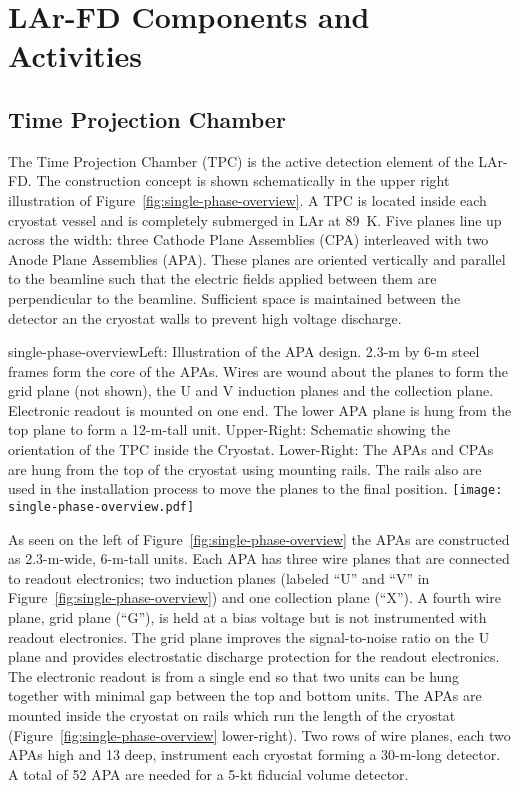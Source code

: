 \section{LAr-FD Components and Activities}
\label{sec:larfd-components}

\subsection{Time Projection Chamber}

The Time Projection Chamber (TPC) is the active detection element of the LAr-FD. The construction concept is  shown schematically in the upper right illustration of Figure~\ref{fig:single-phase-overview}.  A TPC is located inside each cryostat vessel and is completely submerged in LAr at 89~K. Five planes line up across the width: three Cathode Plane Assemblies (CPA)   interleaved with two Anode Plane Assemblies (APA). These planes are oriented vertically and  parallel to the beamline such that the electric fields applied between them are perpendicular to the beamline. Sufficient space is maintained between the detector an the cryostat walls to prevent high voltage discharge. 


\begin{cdrfigure}{single-phase-overview}{Left: Illustration of the APA design. 2.3-m by 6-m steel frames form the core of the APAs. Wires are wound about the planes to form the grid plane (not shown), the U and V induction planes and the collection plane. Electronic readout is mounted on one end. The lower APA plane is hung from the top plane to form a 12-m-tall unit. Upper-Right: Schematic showing the orientation of the TPC inside the Cryostat. Lower-Right: The APAs and CPAs are hung from the top of the cryostat using mounting rails. The rails also are used in the installation process to move the planes to the final position. }
 \texttt{[image: single-phase-overview.pdf]}
\end{cdrfigure}
 
As seen on the left of Figure~\ref{fig:single-phase-overview} the APAs are constructed as 2.3-m-wide, 6-m-tall units. Each APA has three wire planes that are connected to readout electronics; two induction planes (labeled ``U'' and ``V'' in Figure~\ref{fig:single-phase-overview}) and one collection plane (``X''). A fourth wire plane, grid plane (``G''), is held at a bias voltage but is not instrumented with readout electronics. The grid plane improves the signal-to-noise ratio on the U plane and provides electrostatic discharge protection for the readout electronics. The electronic readout is from a single end so that two units can be hung together with minimal gap between the top and bottom units. The APAs are mounted inside the cryostat on rails which run the length of the cryostat (Figure~\ref{fig:single-phase-overview} lower-right). Two rows of wire planes, each two APAs high and 13 deep, instrument each cryostat forming a 30-m-long detector. A total of 52 APA are needed for a 5-kt fiducial volume detector. 

